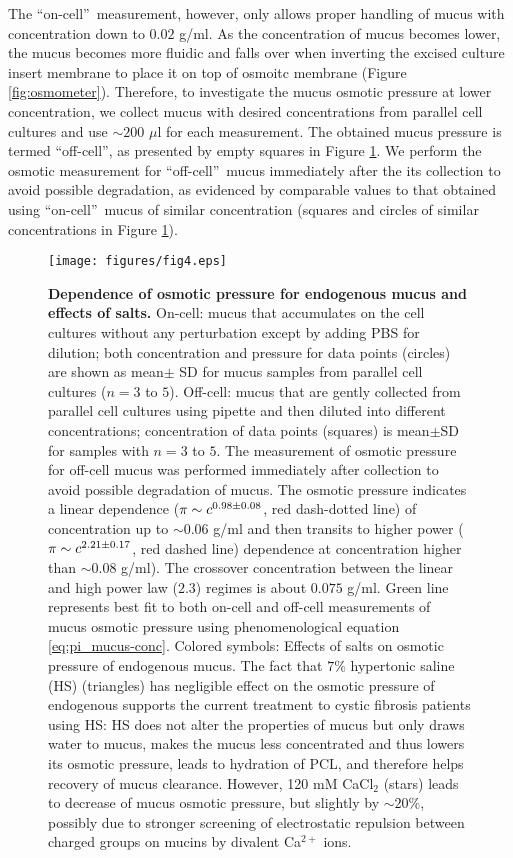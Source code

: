 \documentclass[8.5pt,twoside,twocolumn]{article}
\begin{document}
The \textquotedblleft on-cell\textquotedblright\ measurement, however, only
allows proper handling of mucus with concentration down to $0.02$ g/ml. As
the concentration of mucus becomes lower, the mucus becomes more fluidic and
falls over when inverting the excised culture insert membrane to place it on
top of osmoitc membrane (Figure \ref{fig:osmometer}). Therefore, to
investigate the mucus osmotic pressure at lower concentration, we collect
mucus with desired concentrations from parallel cell cultures and use $\sim
200$ $\mu $l for each measurement. The obtained mucus pressure is termed
\textquotedblleft off-cell\textquotedblright , as presented by empty squares
in Figure \ref{fig:salt}. We perform the osmotic measurement for
\textquotedblleft off-cell\textquotedblright\ mucus immediately after the
its collection to avoid possible degradation, as evidenced by comparable
values to that obtained using \textquotedblleft on-cell\textquotedblright\
mucus of similar concentration (squares and circles of similar
concentrations in Figure \ref{fig:salt}). 
\begin{figure}[h!]
\centering
\texttt{[image: figures/fig4.eps]}
\caption{\textbf{Dependence of osmotic pressure for endogenous mucus and
effects of salts.} On-cell: mucus that accumulates on the cell cultures
without any perturbation except by adding PBS for dilution; both
concentration and pressure for data points (circles) are shown as mean$\pm $%
SD for mucus samples from parallel cell cultures ($n=3$ to $5$). Off-cell:
mucus that are gently collected from parallel cell cultures using pipette
and then diluted into different concentrations; concentration of data points
(squares) is mean$\pm $SD for samples with $n=3$ to $5$. The measurement of
osmotic pressure for off-cell mucus was performed immediately after
collection to avoid possible degradation of mucus. The osmotic pressure
indicates a linear dependence ($\protect\pi \sim c^{0.98\pm 0.08}$, red
dash-dotted line) of concentration up to $\sim 0.06$ g/ml and then transits
to higher power ($\protect\pi \sim c^{2.21\pm 0.17}$, red dashed line)
dependence at concentration higher than $\sim 0.08$ g/ml). The crossover
concentration between the linear and high power law ($2.3$) regimes is about 
$0.075$ g/ml. Green line represents best fit to both on-cell and off-cell
measurements of mucus osmotic pressure using phenomenological equation 
\protect\ref{eq:pi_mucus-conc}. Colored symbols: Effects of salts on osmotic
pressure of endogenous mucus. The fact that $7\%$ hypertonic saline (HS)
(triangles) has negligible effect on the osmotic pressure of endogenous
supports the current treatment to cystic fibrosis patients using HS: HS does
not alter the properties of mucus but only draws water to mucus, makes the
mucus less concentrated and thus lowers its osmotic pressure, leads to
hydration of PCL, and therefore helps recovery of mucus clearance. However,
120 mM CaCl$_{2}$ (stars) leads to decrease of mucus osmotic pressure, but
slightly by $\sim 20\%$, possibly due to stronger screening of electrostatic
repulsion between charged groups on mucins by divalent Ca$^{2+} $ ions. }
\label{fig:salt}
\end{figure}
\end{document}
